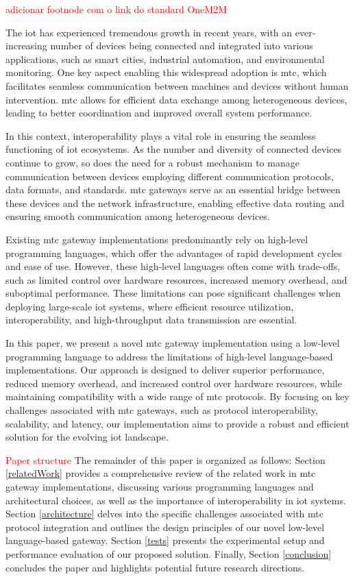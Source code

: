 \documentclass[a4paper,fleqn]{cas-dc}
\begin{document}
\textcolor{red}{adicionar footnode com o link do standard OneM2M}

The \gls{iot} has experienced tremendous growth in recent years, with an ever-increasing number of devices being connected and integrated into various applications, such as smart cities, industrial automation, and environmental monitoring. One key aspect enabling this widespread adoption is \gls{mtc}, which facilitates seamless communication between machines and devices without human intervention. \gls{mtc} allows for efficient data exchange among heterogeneous devices, leading to better coordination and improved overall system performance.

In this context, interoperability plays a vital role in ensuring the seamless functioning of \gls{iot} ecosystems. As the number and diversity of connected devices continue to grow, so does the need for a robust mechanism to manage communication between devices employing different communication protocols, data formats, and standards. \gls{mtc} gateways serve as an essential bridge between these devices and the network infrastructure, enabling effective data routing and ensuring smooth communication among heterogeneous devices.

Existing \gls{mtc} gateway implementations predominantly rely on high-level programming languages, which offer the advantages of rapid development cycles and ease of use. However, these high-level languages often come with trade-offs, such as limited control over hardware resources, increased memory overhead, and suboptimal performance. These limitations can pose significant challenges when deploying large-scale \gls{iot} systems, where efficient resource utilization, interoperability, and high-throughput data transmission are essential.

In this paper, we present a novel \gls{mtc} gateway implementation using a low-level programming language to address the limitations of high-level language-based implementations. Our approach is designed to deliver superior performance, reduced memory overhead, and increased control over hardware resources, while maintaining compatibility with a wide range of \gls{mtc} protocols. By focusing on key challenges associated with \gls{mtc} gateways, such as protocol interoperability, scalability, and latency, our implementation aims to provide a robust and efficient solution for the evolving \gls{iot} landscape.

\textcolor{red}{Paper structure} The remainder of this paper is organized as follows: Section \ref{relatedWork} provides a comprehensive review of the related work in \gls{mtc} gateway implementations, discussing various programming languages and architectural choices, as well as the importance of interoperability in \gls{iot} systems. Section \ref{architecture} delves into the specific challenges associated with \gls{mtc} protocol integration and outlines the design principles of our novel low-level language-based gateway. Section \ref{tests} presents the experimental setup and performance evaluation of our proposed solution. Finally, Section \ref{conclusion} concludes the paper and highlights potential future research directions.
\end{document}

